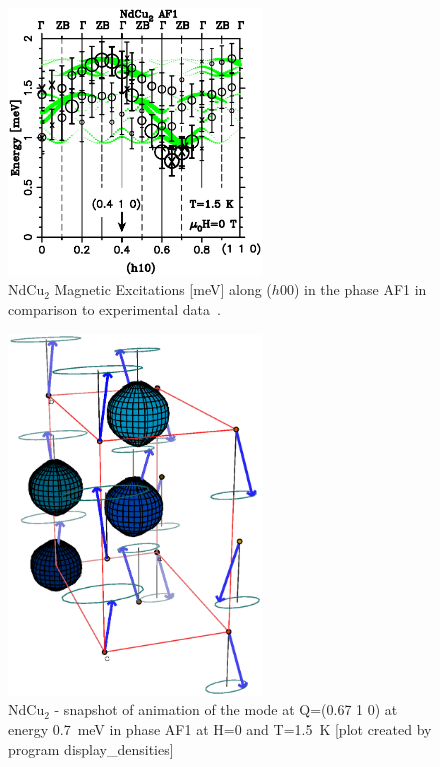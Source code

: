 \begin{figure}[tb]%
\begin{center}\leavevmode
\includegraphics[angle=-0, width=0.6\textwidth]{figsrc/dispAF1.ps}
\end{center}
\caption{NdCu$_2$ Magnetic Excitations [meV] along ($h$00) in the phase AF1 in comparison to experimental %
data~\cite{rotter02-751}.}
\end{figure}

\begin{figure}[ht]%
\begin{center}\leavevmode
\includegraphics[angle=-0, width=0.6\textwidth]{figsrc/animationAF1.eps}
\end{center}
\caption{NdCu$_2$ - snapshot of animation of the mode 
at Q=(0.67 1 0) at energy 0.7~meV in phase AF1 at 
H=0 and T=1.5~K [plot created by program 
{\prg display\_densities}]
}\label{animationAF1}
\end{figure}

